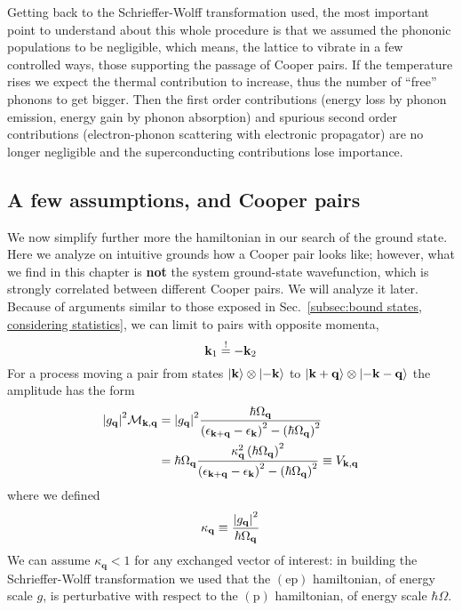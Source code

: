 Getting back to the Schrieffer-Wolff transformation used, the most important point to understand about this whole procedure is that we assumed the phononic populations to be negligible, which means, the lattice to vibrate in a few controlled ways, those supporting the passage of Cooper pairs. If the temperature rises we expect the thermal contribution to increase, thus the number of ``free'' phonons to get bigger. Then the first order contributions (energy loss by phonon emission, energy gain by phonon absorption) and spurious second order contributions (electron-phonon scattering with electronic propagator) are no longer negligible and the superconducting contributions lose importance.

\subsection{A few assumptions, and Cooper pairs}\label{subsec:a few assumptions, and cooper pairs}

We now simplify further more the hamiltonian in our search of the ground state. Here we analyze on intuitive grounds how a Cooper pair looks like; however, what we find in this chapter is \textbf{not} the system ground-state wavefunction, which is strongly correlated between different Cooper pairs. We will analyze it later.
Because of arguments similar to those exposed in Sec.~\ref{subsec:bound states, considering statistics}, we can limit to pairs with opposite momenta,
\[
	\mathbf{k}_1 \stackrel{!}{=} - \mathbf{k}_2
\]
For a process moving a pair from states $\ket{\mathbf{k}}\otimes\ket{-\mathbf{k}}$ to $\ket{\mathbf{k}+\mathbf{q}}\otimes\ket{-\mathbf{k}-\mathbf{q}}$ the amplitude has the form
\[
\begin{aligned}
	\abs{g_\mathbf{q}}^2 \mathcal{M}_{\mathbf{k},\mathbf{q}} &= \abs{g_\mathbf{q}}^2 \frac{
		\hbar\Omega_\mathbf{q}
	}{
		\left({\epsilon_{\mathbf{k}+\mathbf{q}} - \epsilon_\mathbf{k}}\right)^2 - \left({\hbar\Omega_\mathbf{q}}\right)^2
	} \\
	&= \hbar\Omega_\mathbf{q} \frac{
		\kappa_\mathbf{q}^2 \left({\hbar\Omega_\mathbf{q}}\right)^2
	}{
		\left({\epsilon_{\mathbf{k}+\mathbf{q}} - \epsilon_\mathbf{k}}\right)^2 - \left({\hbar\Omega_\mathbf{q}}\right)^2
	}
	\equiv V_{\mathbf{k},\mathbf{q}}
\end{aligned}
\]
where we defined
\[
	\kappa_\mathbf{q} \equiv \frac{\abs{g_\mathbf{q}}^2}{\hbar\Omega_\mathbf{q}}
\]
We can assume $\kappa_\mathbf{q} < 1$ for any exchanged vector of interest: in building the Schrieffer-Wolff transformation we used that the $(\mathrm{ep})$ hamiltonian, of energy scale $g$, is perturbative with respect to the $(\mathrm{p})$ hamiltonian, of energy scale $\hbar\Omega$.


